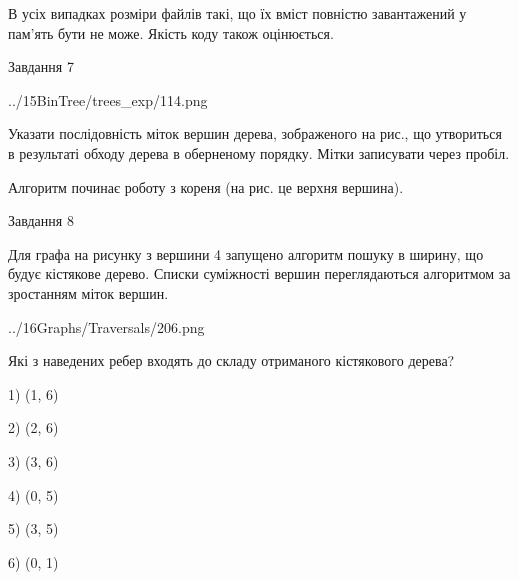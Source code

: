 \documentclass[12pt, ukrainian]{article}
\begin{document}
{В усіх випадках розміри файлів такі, що їх вміст повністю завантажений у пам'ять бути не може. Якість коду також оцінюється.



\vspace{10mm}\par

\newpage
\begin{minipage}[t]{9.7cm}
               
{\begin{center}Завдання {7}\end{center}}
\vspace{-4mm}

\begin{center}
	{../15BinTree/trees_exp/114.png}
\end{center}
Указати послідовність міток вершин дерева, зображеного на рис., що утвориться в результаті обходу дерева в оберненому порядку. Мітки записувати через пробіл.\par Алгоритм починає роботу з кореня (на рис. це верхня вершина).\par

\end{minipage}
\vline \hspace{8mm}
\begin{minipage}[t]{8.0cm}
               
{\begin{center}Завдання {8}\end{center}}
\vspace{-4mm}
Для графа на рисунку з вершини 4 запущено алгоритм пошуку в ширину, що будує кістякове дерево. Списки суміжності вершин переглядаються алгоритмом за зростанням міток вершин.\par
\begin{center}
	{../16Graphs/Traversals/206.png}
\end{center}
\par Які з наведених ребер входять до складу отриманого кістякового дерева?\par
1) (1, 6)\par
2) (2, 6)\par
3) (3, 6)\par
4) (0, 5)\par
5) (3, 5)\par
6) (0, 1)\par
{\vskip 15pt} \par


\end{minipage}}
\end{document}
